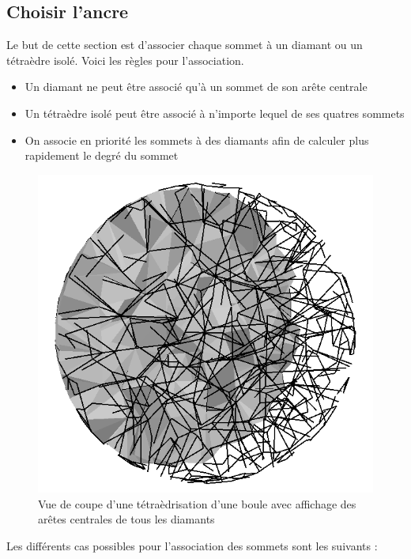 \subsection{Choisir l'ancre}
\noindent
Le but de cette section est d'associer chaque sommet à un diamant ou un tétraèdre isolé. Voici les règles pour l'association.\\
\begin{itemize}
\item Un diamant ne peut être associé qu'à un sommet de son arête centrale
\item Un tétraèdre isolé peut être associé à n'importe lequel de ses quatres sommets
\item On associe en priorité les sommets à des diamants afin de calculer plus rapidement le degré du sommet\\
\end{itemize}
\begin{figure}[th]
\begin{center}
\includegraphics[scale=0.2]{Images/central_edges}
\caption{Vue de coupe d'une tétraèdrisation d'une boule avec affichage des arêtes centrales de tous les diamants}
\label{fig:central_edges}
\end{center}
\end{figure}
\noindent
Les différents cas possibles pour l'association des sommets sont les suivants :\\
